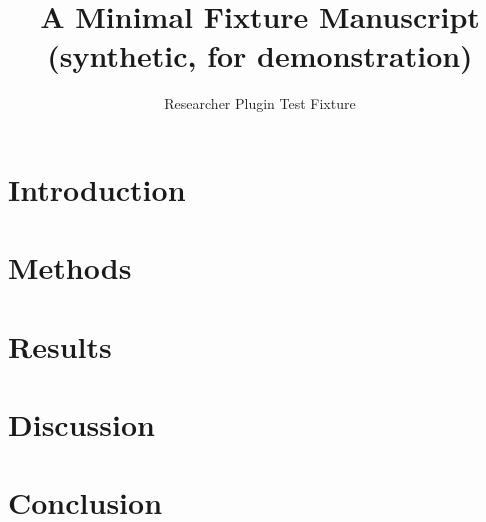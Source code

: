 \documentclass[11pt]{article}
\title{A Minimal Fixture Manuscript (synthetic, for demonstration)}
\author{Researcher Plugin Test Fixture}
\date{}
\begin{document}
\maketitle

\begin{abstract}

\end{abstract}

\section{Introduction}\label{sec:introduction}


\section{Methods}\label{sec:methods}


\section{Results}\label{sec:results}


\section{Discussion}\label{sec:discussion}


\section{Conclusion}\label{sec:conclusion}




\end{document}
